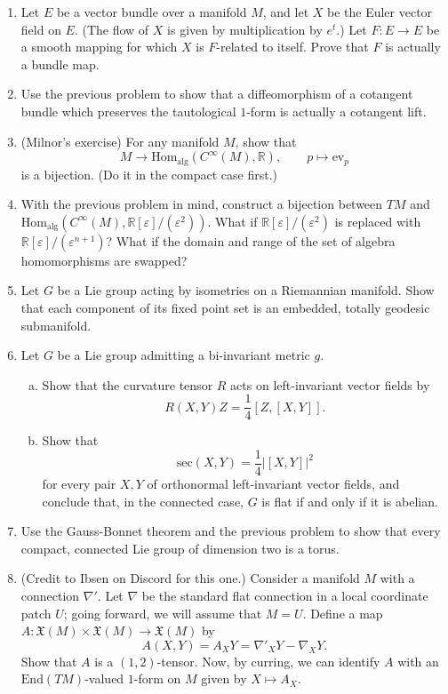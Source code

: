 \documentclass[11pt]{article} %
\begin{document}
\begin{enumerate}
	\item Let $E$ be a vector bundle over a manifold $M$, and let $X$ be the Euler vector field on $E$. (The flow of $X$ is given by multiplication by $e^t$.) Let $F\colon E \to E$ be a smooth mapping for which $X$ is $F$-related to itself. Prove that $F$ is actually a bundle map. 

	\item Use the previous problem to show that a diffeomorphism of a cotangent bundle which preserves the tautological $1$-form is actually a cotangent lift.

	\item (Milnor's exercise) For any manifold $M$, show that 
	\[
		M \to \mathrm{Hom}_{\mathrm{alg}}(C^\infty(M), \mathbb{R}), \qquad p \mapsto \mathrm{ev}_p
	\]
	is a bijection. (Do it in the compact case first.)

	\item With the previous problem in mind, construct a bijection between $TM$ and $\mathrm{Hom}_{\mathrm{alg}}(C^\infty(M), \mathbb{R}[\varepsilon]/(\varepsilon^2))$. What if $\mathbb{R}[\varepsilon]/(\varepsilon^2)$ is replaced with $\mathbb{R}[\varepsilon]/(\varepsilon^{n+1})$? What if the domain and range of the set of algebra homomorphisms are swapped?

	\item Let $G$ be a Lie group acting by isometries on a Riemannian manifold. Show that each component of its fixed point set is an embedded, totally geodesic submanifold.

	\item Let $G$ be a Lie group admitting a bi-invariant metric $g$. 
	\begin{enumerate}[(a)]
		\item Show that the curvature tensor $R$ acts on left-invariant vector fields by 
		\[
			R(X, Y)Z = \frac{1}{4}[Z,[X,Y]].
		\]

		\item Show that 
		\[
			\mathrm{sec}(X, Y) = \frac{1}{4}\left|[X,Y]\right|^2
		\]
		for every pair $X,Y$ of orthonormal left-invariant vector fields, and conclude that, in the connected case, $G$ is flat if and only if it is abelian.
	\end{enumerate}
	
	\item Use the Gauss-Bonnet theorem and the previous problem to show that every compact, connected Lie group of dimension two is a torus.

	\item (Credit to Ibsen on Discord for this one.) Consider a manifold $M$ with a connection $\nabla'$. Let $\nabla$ be the standard flat connection in a local coordinate patch $U$; going forward, we will assume that $M = U$. Define a map $A\colon \mathfrak{X}(M) \times \mathfrak{X}(M) \to \mathfrak{X}(M)$ by 
	\[
		A(X, Y) = A_XY = \nabla'_XY - \nabla_XY.
	\]
	Show that $A$ is a $(1, 2)$-tensor. Now, by curring, we can identify $A$ with an $\mathrm{End}(TM)$-valued $1$-form on $M$ given by $X \mapsto A_X$.


\end{enumerate}
\end{document}
